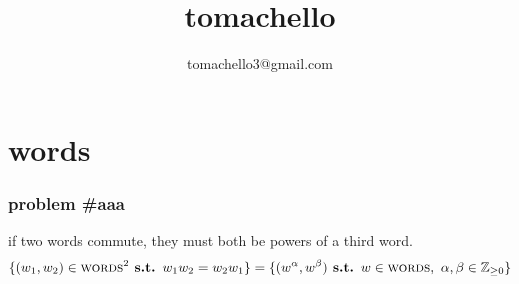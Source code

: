 \documentclass{article}
\title{tomachello}
\author{tomachello3@gmail.com}
\date{}
\newcommand{\st}{\textbf{ s.t. }}
\newcommand{\SP}{\text{ }}
\newcommand{\Zpf}{\mathbb{Z}_{\ge0}}
\newcommand{\words}{\textsc{words}}
\begin{document}
\maketitle

\section*{words}
\subsubsection*{problem \#aaa} if two words commute, they must both be powers of a third word. 
$$\{(w_1,w_2)\in \words^2 \st w_1w_2=w_2w_1\}=\{(w^\alpha,w^\beta)\st w\in\words,\SP\alpha,\beta\in\Zpf\}$$
\end{document}
